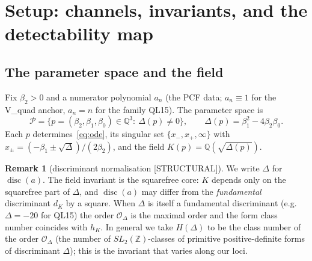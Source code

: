 \documentclass[11pt]{article}
\theoremstyle{definition}
\newtheorem{remark}[theorem]{Remark}
\newcommand{\Q}{\mathbb{Q}}
\newcommand{\Z}{\mathbb{Z}}
\newcommand{\disc}{\operatorname{disc}}
\newcommand{\STRUCTURAL}{\textsf{[STRUCTURAL]}}
\begin{document}
\section{Setup: channels, invariants, and the detectability map}\label{sec:setup}

\subsection{The parameter space and the field}
Fix $\beta_2>0$ and a numerator polynomial $a_n$ (the PCF data; $a_n\equiv1$ for the
V\_quad anchor, $a_n=n$ for the family QL15). The parameter space is
\[
  \mathcal P=\{p=(\beta_2,\beta_1,\beta_0)\in\Q^3:\ \Delta(p)\neq0\},\qquad
  \Delta(p)=\beta_1^2-4\beta_2\beta_0 .
\]
Each $p$ determines~\eqref{eq:ode}, its singular set $\{x_-,x_+,\infty\}$ with
$x_\pm=(-\beta_1\pm\sqrt{\Delta})/(2\beta_2)$, and the field $K(p)=\Q(\sqrt{\Delta(p)})$.

\begin{remark}[discriminant normalisation \STRUCTURAL]\label{rmk:disc}
We write $\Delta$ for $\disc(a)$. The field invariant is the squarefree core: $K$
depends only on the squarefree part of $\Delta$, and $\disc(a)$ may differ from the
\emph{fundamental} discriminant $d_K$ by a square. When $\Delta$ is itself a
fundamental discriminant (e.g.\ $\Delta=-20$ for QL15) the order $\mathcal O_\Delta$
is the maximal order and the form class number coincides with $h_K$. In general we
take $H(\Delta)$ to be the class number of the order $\mathcal O_\Delta$ (the number
of $SL_2(\Z)$-classes of primitive positive-definite forms of discriminant $\Delta$);
this is the invariant that varies along our loci.
\end{remark}
\end{document}
